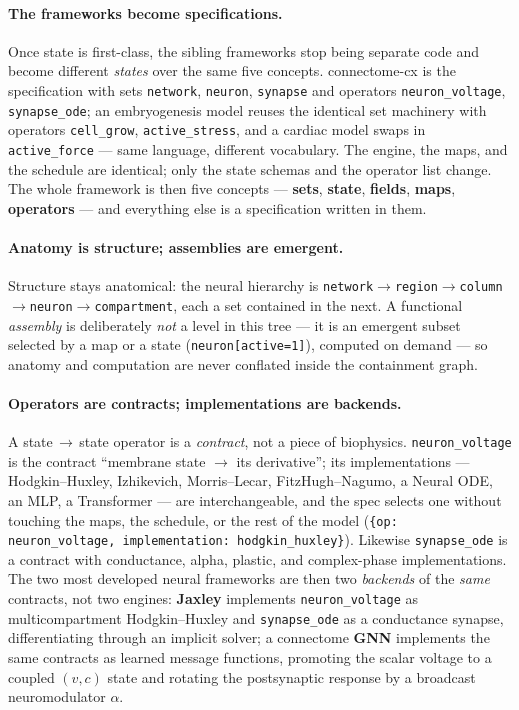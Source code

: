 \documentclass[11pt]{article}
\newcommand{\code}[1]{\texttt{#1}}
\begin{document}
\paragraph{The frameworks become specifications.} Once state is first-class, the
sibling frameworks stop being separate code and become different \emph{states} over
the same five concepts. connectome-cx is the specification with sets
\code{network}, \code{neuron}, \code{synapse} and operators \code{neuron\_voltage},
\code{synapse\_ode}; an embryogenesis model reuses the identical set machinery with
operators \code{cell\_grow}, \code{active\_stress}, and a cardiac model swaps in
\code{active\_force} --- same language, different vocabulary.
The engine, the maps, and the schedule are identical; only the state schemas and the
operator list change. The whole framework is then five concepts --- \textbf{sets},
\textbf{state}, \textbf{fields}, \textbf{maps}, \textbf{operators} --- and everything
else is a specification written in them.

\paragraph{Anatomy is structure; assemblies are emergent.} Structure stays
anatomical: the neural hierarchy is
\code{network}$\to$\code{region}$\to$\code{column}$\to$\code{neuron}$\to$\code{compartment},
each a set contained in the next. A functional \emph{assembly} is deliberately
\emph{not} a level in this tree --- it is an emergent subset selected by a map or a
state (\code{neuron[active=1]}), computed on demand --- so anatomy and computation
are never conflated inside the containment graph.

\paragraph{Operators are contracts; implementations are backends.} A
state\,$\to$\,state operator is a \emph{contract}, not a piece of biophysics.
\code{neuron\_voltage} is the contract ``membrane state $\to$ its derivative''; its
implementations --- Hodgkin--Huxley, Izhikevich, Morris--Lecar, FitzHugh--Nagumo, a
Neural ODE, an MLP, a Transformer --- are interchangeable, and the spec selects one
without touching the maps, the schedule, or the rest of the model
(\code{\{op: neuron\_voltage, implementation: hodgkin\_huxley\}}). Likewise
\code{synapse\_ode} is a contract with conductance, alpha, plastic, and complex-phase
implementations. The two most developed neural frameworks are then two
\emph{backends} of the \emph{same} contracts, not two engines: \textbf{Jaxley}
implements \code{neuron\_voltage} as multicompartment Hodgkin--Huxley and
\code{synapse\_ode} as a conductance synapse, differentiating through an implicit
solver; a connectome \textbf{GNN} implements the same contracts as learned message
functions, promoting the scalar voltage to a coupled $(v,c)$ state and rotating the
postsynaptic response by a broadcast neuromodulator $\alpha$.
\end{document}
